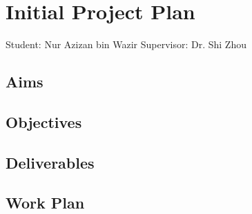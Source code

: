 \section{Initial Project Plan}
Student: Nur Azizan bin Wazir
Supervisor: Dr. Shi Zhou

\subsection{Aims}


\subsection{Objectives}


\subsection{Deliverables}


\subsection{Work Plan}



